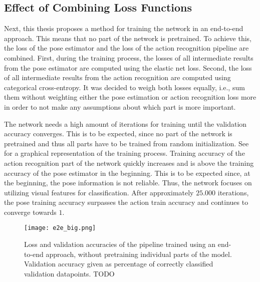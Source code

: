 
\subsection{Effect of Combining Loss Functions}
Next, this thesis proposes a method for training the network in an end-to-end approach.
This means that no part of the network is pretrained.
To achieve this, the loss of the pose estimator and the loss of the action recognition pipeline are combined.
First, during the training process, the losses of all intermediate results from the pose estimator are computed using the elastic net loss.
Second, the loss of all intermediate results from the action recognition are computed using categorical cross-entropy.
It was decided to weigh both losses equally, i.e., sum them without weighting either the pose estimation or action recognition loss more in order to not make any assumptions about which part is more important.

The network needs a high amount of iterations for training until the validation accuracy converges.
This is to be expected, since no part of the network is pretrained and thus all parts have to be trained from random initialization.
See  for a graphical representation of the training process.
Training accuracy of the action recognition part of the network quickly increases and is above the training accuracy of the pose estimator in the beginning.  
This is to be expected since, at the beginning, the pose information is not reliable.
Thus, the network focuses on utilizing visual features for classification.
After approximately $25.000$ iterations, the pose training accuracy surpasses the action train accuracy and continues to converge towards $1$.



\begin{figure}[htb!]
    \centering
    \texttt{[image: e2e\_big.png]}
    \caption{Loss and validation accuracies of the pipeline trained using an end-to-end approach, without pretraining individual parts of the model. Validation accuracy given as percentage of correctly classified validation datapoints. TODO}
    \label{fig:e2e_big}
\end{figure}

